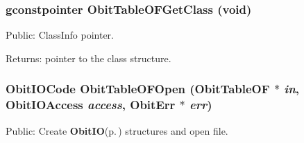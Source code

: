 \subsubsection{\setlength{\rightskip}{0pt plus 5cm}gconstpointer Obit\-Table\-OFGet\-Class (void)}\label{ObitTableOF_8h_a13}


Public: Class\-Info pointer. 

\begin{Desc}
\item[Returns:]pointer to the class structure. \end{Desc}
\subsubsection{\setlength{\rightskip}{0pt plus 5cm}Obit\-IOCode Obit\-Table\-OFOpen ({\bf Obit\-Table\-OF} $\ast$ {\em in}, Obit\-IOAccess {\em access}, {\bf Obit\-Err} $\ast$ {\em err})}\label{ObitTableOF_8h_a17}


Public: Create {\bf Obit\-IO}{\rm (p.\,\pageref{structObitIO})} structures and open file. 

